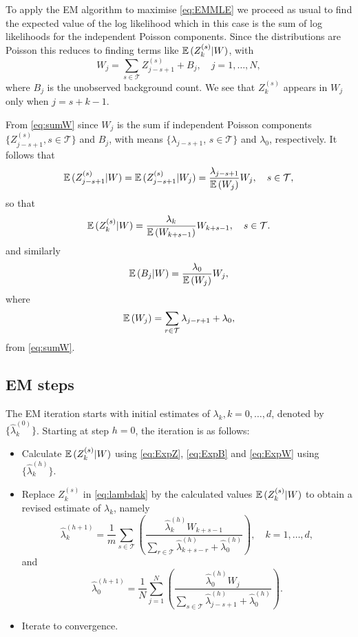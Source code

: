 To apply the EM algorithm to maximise \ref{eq:EMMLE} we proceed as usual to find the expected value of the log likelihood which in this case is the sum of log likelihoods for the independent Poisson components. Since the distributions are Poisson this reduces to finding terms like $\mathbb{E}\,(Z^{(s)}_k | W)$, with     
\begin{equation}\label{eq:sumW}
W_j = \sum_{s \in\mathcal{T}} Z^{(s)}_{j-s+1} + B_j,\quad j = 1,\dots,N,
\end{equation}
where $B_j$ is the unobserved background count. We see that $Z^{(s)}_k$ appears in $W_j$ only when $j = s+k-1$.  

From \eqref{eq:sumW} since $W_j$ is the sum if independent Poisson components $\{Z^{(s)}_{j-s+1}, s \in \mathcal{T}\}$ and $B_j$, with means $\{\lambda_{j-s+1}$, $s \in \mathcal{T}\}$ and $\lambda_0$, respectively. It follows that 
$$ \mathbb{E}\,(Z^{(s)}_{j-s+1} | W) = \mathbb{E}\,(Z^{(s)}_{j-s+1} | W_j) = \frac{\lambda_{j-s+1}}{\mathbb{E}\,(W_j)} W_j, \quad s \in \mathcal{T},$$
so that 
\begin{equation}\label{eq:ExpZ} \mathbb{E}\,(Z^{(s)}_k | W) = \frac{\lambda_{k}}{\mathbb{E}\,(W_{k+s-1})} W_{k+s-1}, \quad s \in \mathcal{T}.\end{equation}
and similarly
\begin{equation}\label{eq:ExpB} \mathbb{E}\,(B_j|W) = \frac{\lambda_0}{\mathbb{E}\,(W_j)} W_j,\end{equation}
where 
\begin{equation}\label{eq:ExpW}\mathbb{E}\,(W_j) = \sum_{r \in\mathcal{T}} \lambda_{j-r+1} + \lambda_0,\end{equation}
from \ref{eq:sumW}.

\subsection{EM steps}
The EM iteration starts with initial estimates of $\lambda_k,k=0,\dots,d$, denoted by $\{\hat{\lambda}^{(0)}_k\}$. Starting at step $h=0$, the iteration is as follows: 

\begin{itemize}
\item[(1)] Calculate $\mathbb{E}\,(Z^{(s)}_k | W)$ using \eqref{eq:ExpZ}, \eqref{eq:ExpB} and \eqref{eq:ExpW} using $\{\hat{\lambda}^{(h)}_k\}$.
\item[(2)] Replace $Z_k^{(s)}$ in \eqref{eq:lambdak} by the calculated values $\mathbb{E}\,(Z^{(s)}_k | W)$ to obtain a revised estimate of $\lambda_k$, namely
$$ \hat{\lambda}_k^{(h+1)} = \frac{1}{m}  \sum_{s\in \mathcal{T}} 
\left(\frac{\hat{\lambda}_k^{(h)} W_{k+s-1}}{\sum_{r \in\mathcal{T}} \hat{\lambda}_{k+s-r}^{(h)} + \hat{\lambda}_0^{(h)}}\right),\quad k=1,\dots,d,$$
and 
$$ \hat{\lambda}_0^{(h+1)} = \frac{1}{N}\sum_{j=1}^N \left( \frac{\hat{\lambda}_0^{(h)} W_j  }{\sum_{s \in \mathcal{T}} \hat{\lambda}_{j-s+1}^{(h)} + \hat{\lambda}_0^{(h)}}\right).$$
\item[(3)] Iterate to convergence.
\end{itemize}

